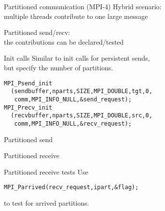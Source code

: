 
\begin{numberedframe}{Partitioned communication (MPI-4)}
  Hybrid scenario:\\
  multiple threads contribute to one large message

  Partitioned send/recv:\\
  the contributions can be declared/tested
\end{numberedframe}

\begin{numberedframe}{Init calls}
  Similar to init calls for persistent sends,\\
  but specify the number of partitions.
\begin{lstlisting}
MPI_Psend_init
  (sendbuffer,nparts,SIZE,MPI_DOUBLE,tgt,0,
   comm,MPI_INFO_NULL,&send_request);
MPI_Precv_init
  (recvbuffer,nparts,SIZE,MPI_DOUBLE,src,0,
   comm,MPI_INFO_NULL,&recv_request);
\end{lstlisting}
\end{numberedframe}

\begin{numberedframe}{Partitioned send}
\end{numberedframe}

\begin{numberedframe}{Partitioned receive}
\end{numberedframe}

\begin{numberedframe}{Partitioned receive tests}
Use 
\begin{lstlisting}
MPI_Parrived(recv_request,ipart,&flag);
\end{lstlisting}
to test for arrived partitions.
\end{numberedframe}


